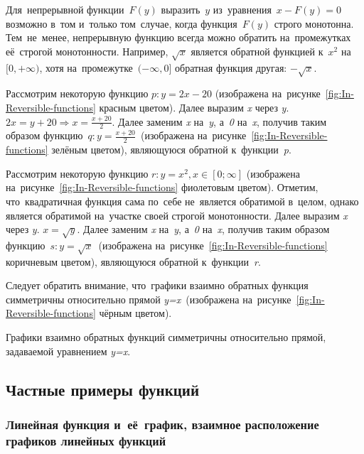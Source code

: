 \documentclass[]{scrartcl}
\begin{document}
Для~непрерывной функции~${\displaystyle F(y)}$ выразить~${\displaystyle y}$ из~уравнения~${\displaystyle x-F(y)=0}$ возможно в~том и~только том~случае, когда функция~${\displaystyle F(y)}$ строго монотонна. Тем~не~менее, непрерывную функцию всегда можно обратить на~промежутках её~строгой монотонности. Например, ${\displaystyle {\sqrt {x}}}$ является обратной функцией к~${\displaystyle x^{2}}$ на~${\displaystyle [0,+\infty )}$, хотя на~промежутке~${\displaystyle (-\infty ,0]}$ обратная функция другая: ${\displaystyle -{\sqrt {x}}}$.
\begin{Thexmpl}
	Рассмотрим некоторую функцию ${\displaystyle p:y=2x-20}$ (изображена на~рисунке~\ref{fig:In-Reversible-functions} красным цветом). Далее выразим \textit{x} через \textit{y}. ${\displaystyle 2x=y+20 \Rightarrow x=\frac{x+20}{2}}$. Далее заменим \textit{x} на~\textit{y}, а~\textit{0} на~\textit{x}, получив таким образом функцию~${\displaystyle q:y=\frac{x+20}{2}}$~(изображена на~рисунке~\ref{fig:In-Reversible-functions} зелёным цветом), являющуюся обратной к~функции~\textit{p}.
\end{Thexmpl}
\begin{Thexmpl}
	Рассмотрим некоторую функцию ${\displaystyle r:y=x^{2}, x \in [0;\infty]}$ (изображена на~рисунке~\ref{fig:In-Reversible-functions} фиолетовым цветом). Отметим, что~квадратичная функция сама по~себе не~является обратимой в~целом, однако является обратимой на~участке своей строгой монотонности. Далее выразим \textit{x} через \textit{y}. ${\displaystyle x=\sqrt{y}}$. Далее заменим \textit{x} на~\textit{y}, а~\textit{0} на~\textit{x}, получив таким образом функцию~${\displaystyle s:y=\sqrt{x}}$~(изображена на~рисунке~\ref{fig:In-Reversible-functions} коричневым цветом), являющуюся обратной к~функции~\textit{r}.
\end{Thexmpl}
Следует обратить внимание, что~графики взаимно обратных функция симметричны относительно прямой \textit{y=x}~(изображена на~рисунке~\ref{fig:In-Reversible-functions} чёрным цветом).
\begin{proposition}
	Графики взаимно обратных функций симметричны относительно прямой, задаваемой уравнением \textit{y=x}.
\end{proposition}


\subsection{Частные примеры функций}
\subsubsection{Линейная функция и~её~график, взаимное расположение графиков линейных функций}
\end{document}
